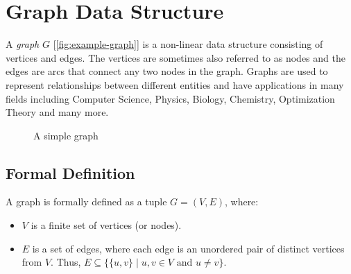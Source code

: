 \documentclass{article}
\begin{document}
\newpage
    
\newpage

\newpage
    \tableofcontents
\newpage

\section{Graph Data Structure}
A \emph{graph} $G$ [\autoref{fig:example-graph}] is a non-linear data structure consisting of vertices and edges. The vertices are sometimes also referred to as nodes and the edges are arcs that connect any two nodes in the graph. Graphs are used to represent relationships between different entities and have applications in many fields including Computer Science, Physics, Biology, Chemistry, Optimization Theory and many more.

\begin{figure}[H]
    \centering
    \caption{A simple graph}
    \label{fig:example-graph}
\end{figure}

\subsection{Formal Definition}
A graph is formally defined as a tuple $G = (V, E)$, where:
\begin{itemize}
    \item $V$ is a finite set of vertices (or nodes).
    \item $E$ is a set of edges, where each edge is an unordered pair of distinct vertices from $V$. Thus, $E \subseteq \{\{u, v\} \mid u, v \in V \text{ and } u \neq v\}$.
\end{itemize}
\end{document}
